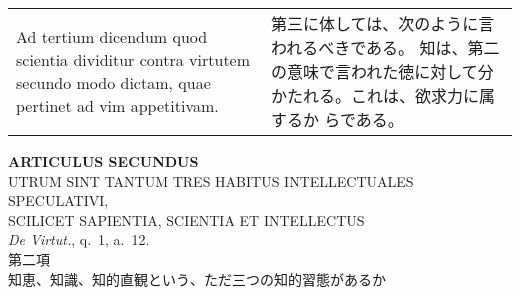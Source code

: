 \documentclass[10pt]{jsarticle} %
\begin{document}
\begin{longtable}{p{21em}p{21em}}
\\




Ad tertium dicendum{\scshape } quod scientia
 dividitur contra virtutem secundo modo dictam, quae pertinet ad vim
 appetitivam.

&

第三に体しては、次のように言われるべきである。
知は、第二の意味で言われた徳に対して分かたれる。これは、欲求力に属するか
 らである。



\end{longtable}

\newpage


\begin{center}
 {\Large {\bf ARTICULUS SECUNDUS}}\\
 {\large UTRUM SINT TANTUM TRES HABITUS INTELLECTUALES
 SPECULATIVI,\\SCILICET SAPIENTIA, SCIENTIA ET INTELLECTUS}\\
 {\footnotesize {\itshape De Virtut.}, q.~1, a.~12.}\\
 {\Large 第二項\\知恵、知識、知的直観という、ただ三つの知的習態があるか}
\end{center}
\end{document}
